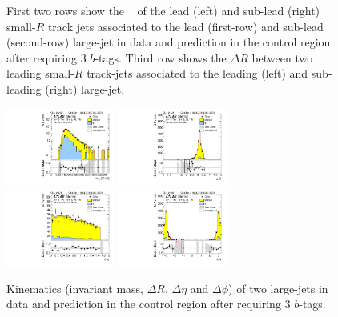\begin{figure}[htbp!]
\begin{center}
  \caption{First two rows show the \pt~ of the lead (left) and sub-lead (right) small-$R$ track jets associated to the lead (first-row) and sub-lead (second-row) large-\R jet in data and prediction in the control region after requiring 3 $b$-tags. Third row shows the $\Delta R$ between two leading small-$R$ track-jets associated to the leading (left) and sub-leading (right) large-\R jet.  }
  \label{fig:boosted-3b-control-ak2}
\end{center}
\end{figure}


\begin{figure}[htbp!]
\begin{center}
\includegraphics[width=0.32\textwidth,angle=-90]{figures/boosted/Control/b77_ThreeTag_Control_mHH_l_1.pdf}
\includegraphics[width=0.32\textwidth,angle=-90]{figures/boosted/Control/b77_ThreeTag_Control_hCandDr.pdf}\\
\includegraphics[width=0.32\textwidth,angle=-90]{figures/boosted/Control/b77_ThreeTag_Control_hCandDeta.pdf}
\includegraphics[width=0.32\textwidth,angle=-90]{figures/boosted/Control/b77_ThreeTag_Control_hCandDphi.pdf}
  \caption{Kinematics (invariant mass, $\Delta R$, $\Delta \eta$ and $\Delta \phi$) of two large-\R jets in data and prediction in the control region after requiring 3 $b$-tags.  }
  \label{fig:boosted-3b-control-ak10-system}
\end{center}
\end{figure}


